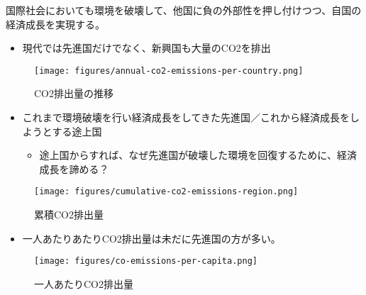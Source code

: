 \documentclass[
  xelatex,
  ja=standard]{bxjsarticle}
\providecommand{\tightlist}{%
  \setlength{\itemsep}{0pt}\setlength{\parskip}{0pt}}\usepackage{longtable,booktabs,array}
\begin{document}
国際社会においても環境を破壊して、他国に負の外部性を押し付けつつ、自国の経済成長を実現する。

\begin{itemize}
\tightlist
\item
  現代では先進国だけでなく、新興国も大量のCO2を排出
\end{itemize}

\begin{figure}[htpb]

{\centering \texttt{[image: figures/annual-co2-emissions-per-country.png]}

}

\caption{CO2排出量の推移}

\end{figure}

\begin{itemize}
\tightlist
\item
  これまで環境破壊を行い経済成長をしてきた先進国／これから経済成長をしようとする途上国

  \begin{itemize}
  \tightlist
  \item
    途上国からすれば、なぜ先進国が破壊した環境を回復するために、経済成長を諦める？
  \end{itemize}
\end{itemize}

\begin{figure}[htpb]

{\centering \texttt{[image: figures/cumulative-co2-emissions-region.png]}

}

\caption{累積CO2排出量}

\end{figure}

\begin{itemize}
\tightlist
\item
  一人あたりあたりCO2排出量は未だに先進国の方が多い。
\end{itemize}

\begin{figure}[htpb]

{\centering \texttt{[image: figures/co-emissions-per-capita.png]}

}

\caption{一人あたりCO2排出量}

\end{figure}
\end{document}
